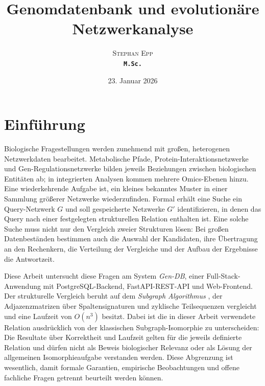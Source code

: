 \documentclass[a4paper,12pt, twoside]{report}
\title{\textbf{Genomdatenbank und evolutionäre Netzwerkanalyse}}
\author{\textsc{Stephan Epp}\\ {\small \texttt{\textbf{M.Sc.}}}}
\date{23. Januar 2026}
\theoremstyle{definition}
\begin{document}
\maketitle

\setcounter{tocdepth}{2}
\tableofcontents
\newpage

\chapter{Einführung}
\label{sec:einleitung}

Biologische Fragestellungen werden zunehmend mit großen, heterogenen Netzwerkdaten bearbeitet. Metabolische Pfade, Protein-Interaktionsnetzwerke und Gen-Regulationsnetzwerke bilden jeweils Beziehungen zwischen biologischen Entitäten ab; in integrierten Analysen kommen mehrere Omics-Ebenen hinzu. Eine wiederkehrende Aufgabe ist, ein kleines bekanntes Muster in einer Sammlung größerer Netzwerke wiederzufinden. Formal erhält eine Suche ein Query-Netzwerk $G$ und soll gespeicherte Netzwerke $G'$ identifizieren, in denen das Query nach einer festgelegten strukturellen Relation enthalten ist. Eine solche Suche muss nicht nur den Vergleich zweier Strukturen lösen: Bei großen Datenbeständen bestimmen auch die Auswahl der Kandidaten, ihre Übertragung an den Rechenkern, die Verteilung der Vergleiche und der Aufbau der Ergebnisse die Antwortzeit.

Diese Arbeit untersucht diese Fragen am System \emph{Gen-DB}, einer Full-Stack-Anwendung mit PostgreSQL-Backend, FastAPI-REST-API und Web-Frontend. Der strukturelle Vergleich beruht auf dem \emph{Subgraph Algorithmus} \cite{epp2026subgraph}, der Adjazenzmatrizen über Spaltensignaturen und zyklische Teilsequenzen vergleicht und eine Laufzeit von $O(n^3)$ besitzt. Dabei ist die in dieser Arbeit verwendete Relation ausdrücklich von der klassischen Subgraph-Isomorphie zu unterscheiden: Die Resultate über Korrektheit und Laufzeit gelten für die jeweils definierte Relation und dürfen nicht als Beweis biologischer Relevanz oder als Lösung der allgemeinen Isomorphieaufgabe verstanden werden. Diese Abgrenzung ist wesentlich, damit formale Garantien, empirische Beobachtungen und offene fachliche Fragen getrennt beurteilt werden können.
\end{document}
